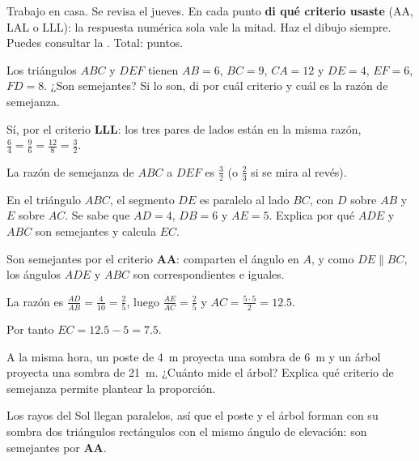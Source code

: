 \documentclass[11pt]{article}
\begin{document}
\encabezado

\begin{instrucciones}
Trabajo en casa. Se revisa el jueves. En cada punto \textbf{di qué criterio usaste} (AA, LAL o
LLL): la respuesta numérica sola vale la mitad. Haz el dibujo siempre. Puedes consultar la
. Total: \totalpuntos{} puntos.
\end{instrucciones}

\begin{preguntas}

\pregunta[1] Los triángulos $ABC$ y $DEF$ tienen $AB = 6$, $BC = 9$, $CA = 12$ y $DE = 4$,
$EF = 6$, $FD = 8$. ¿Son semejantes? Si lo son, di por cuál criterio y cuál es la razón de
semejanza.
\begin{solucion}[3.5cm]
Sí, por el criterio \textbf{LLL}: los tres pares de lados están en la misma razón,
$\frac{6}{4} = \frac{9}{6} = \frac{12}{8} = \frac{3}{2}$.

La razón de semejanza de $ABC$ a $DEF$ es $\frac{3}{2}$ (o $\frac{2}{3}$ si se mira al revés).
\end{solucion}

\pregunta[1.5] En el triángulo $ABC$, el segmento $DE$ es paralelo al lado $BC$, con $D$ sobre
$AB$ y $E$ sobre $AC$. Se sabe que $AD = 4$, $DB = 6$ y $AE = 5$. Explica por qué $ADE$ y
$ABC$ son semejantes y calcula $EC$.
\begin{solucion}[5cm]
Son semejantes por el criterio \textbf{AA}: comparten el ángulo en $A$, y como
$DE \parallel BC$, los ángulos $ADE$ y $ABC$ son correspondientes e iguales.

La razón es $\frac{AD}{AB} = \frac{4}{10} = \frac{2}{5}$, luego $\frac{AE}{AC} = \frac{2}{5}$
y $AC = \frac{5 \cdot 5}{2} = \num{12,5}$.

Por tanto $EC = \num{12,5} - 5 = \num{7,5}$.
\end{solucion}

\pregunta[1] A la misma hora, un poste de \qty{4}{m} proyecta una sombra de \qty{6}{m} y un
árbol proyecta una sombra de \qty{21}{m}. ¿Cuánto mide el árbol? Explica qué criterio de
semejanza permite plantear la proporción.
\begin{solucion}[4cm]
Los rayos del Sol llegan paralelos, así que el poste y el árbol forman con su sombra dos
triángulos rectángulos con el mismo ángulo de elevación: son semejantes por \textbf{AA}.


\end{solucion}
\end{preguntas}
\end{document}
